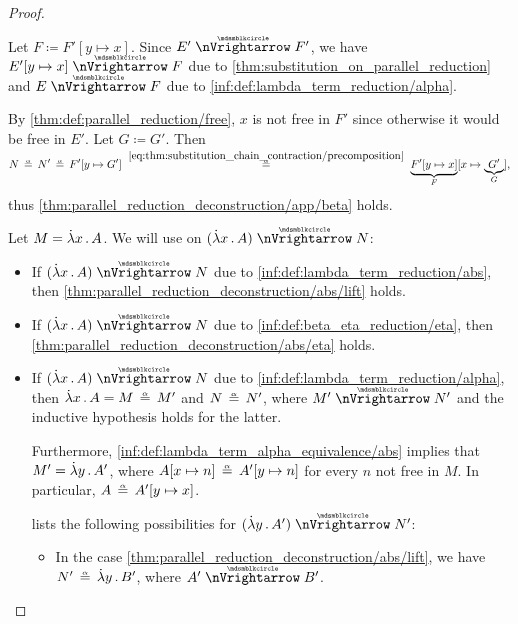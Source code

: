 \begin{proof}
\begin{itemize}
\begin{itemize}
\begin{itemize}
        Let \( F \coloneqq F'[y \mapsto x] \). Since \( E' \ppred F' \), we have \( E'[y \mapsto x] \ppred F \) due to \cref{thm:substitution_on_parallel_reduction} and \( E \ppred F \) due to \ref{inf:def:lambda_term_reduction/alpha}.

        By \cref{thm:def:parallel_reduction/free}, \( x \) is not free in \( F' \) since otherwise it would be free in \( E' \). Let \( G \coloneqq G' \). Then
        \begin{equation*}
          N
          \aequiv
          N'
          \aequiv
          F'[y \mapsto G']
          \reloset {\eqref{eq:thm:substitution_chain_contraction/precomposition}} \aequiv
          \underbrace{F'[y \mapsto x]}_F [x \mapsto \underbrace{G'}_G],
        \end{equation*}
        thus \cref{thm:parallel_reduction_deconstruction/app/beta} holds.
      \end{itemize}
    \end{itemize}
  \end{itemize}

   Let \( M = \qabs x A \). We will use  on \( (\qabs x A) \ppred N \):
  \begin{itemize}
    \item If \( (\qabs x A) \ppred N \) due to \ref{inf:def:lambda_term_reduction/abs}, then \cref{thm:parallel_reduction_deconstruction/abs/lift} holds.

    \item If \( (\qabs x A) \ppred N \) due to \ref{inf:def:beta_eta_reduction/eta}, then \cref{thm:parallel_reduction_deconstruction/abs/eta} holds.

    \item If \( (\qabs x A) \ppred N \) due to \ref{inf:def:lambda_term_reduction/alpha}, then \( \qabs x A = M \aequiv M' \) and \( N \aequiv N' \), where \( M' \ppred N' \) and the inductive hypothesis holds for the latter.

    Furthermore, \ref{inf:def:lambda_term_alpha_equivalence/abs} implies that \( M' = \qabs y A' \), where \( A[x \mapsto n] \aequiv A'[y \mapsto n] \) for every \( n \) not free in \( M \). In particular, \( A \aequiv A'[y \mapsto x] \).

     lists the following possibilities for \( (\qabs y A') \ppred N' \):
    \begin{itemize}
      \item In the case \cref{thm:parallel_reduction_deconstruction/abs/lift}, we have \( N' \aequiv \qabs y B' \), where \( A' \ppred B' \).


\end{itemize}
\end{itemize}
\end{proof}
